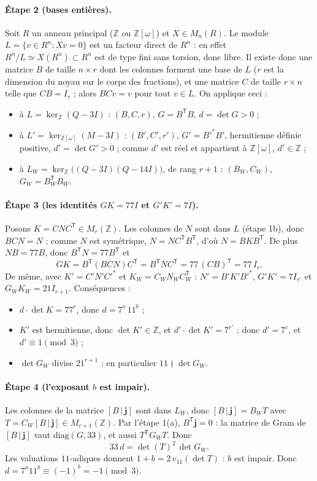 \documentclass[11pt,a4paper]{article}
\theoremstyle{remark}
\newcommand{\Z}{\mathbb{Z}}
\newcommand{\one}{\mathbf{j}}
\begin{document}
\paragraph{Étape 2 (bases entières).}
Soit $R$ un anneau principal ($\Z$ ou $\Z[\omega]$) et $X\in M_n(R)$. Le module $L=\{v\in R^n : Xv=0\}$ est un facteur direct de
$R^n$ : en effet $R^n/L\simeq X(R^n)\subset R^n$ est de type fini sans torsion, donc libre. Il existe donc une matrice $B$ de taille
$n\times r$ dont les colonnes forment une base de $L$ ($r$ est la dimension du noyau sur le corps des fractions), et une matrice
$C$ de taille $r\times n$ telle que $CB=I_r$ ; alors $BCv=v$ pour tout $v\in L$. On applique ceci :
\begin{itemize}[nosep]
\item à $L=\ker_\Z(Q-3I)$ : $(B,C,r)$, $G=B^{\mathsf T}B$, $d=\det G>0$ ;
\item à $L'=\ker_{\Z[\omega]}(M-3I)$ : $(B',C',r')$, $G'=B'^*B'$, hermitienne définie positive, $d'=\det G'>0$ ;
comme $d'$ est réel et appartient à $\Z[\omega]$, $d'\in\Z$ ;
\item à $L_W=\ker_\Z\bigl((Q-3I)(Q-14I)\bigr)$, de rang $r+1$ : $(B_W,C_W)$, $G_W=B_W^{\mathsf T}B_W$.
\end{itemize}

\paragraph{Étape 3 (les identités $GK=77I$ et $G'K'=7I$).}
Posons $K=CNC^{\mathsf T}\in M_r(\Z)$. Les colonnes de $N$ sont dans $L$ (étape 1b), donc $BCN=N$ ; comme $N$ est symétrique,
$N=NC^{\mathsf T}B^{\mathsf T}$, d'où $N=BKB^{\mathsf T}$. De plus $NB=77B$, donc $B^{\mathsf T}N=77B^{\mathsf T}$ et
\[
GK=B^{\mathsf T}(BCN)C^{\mathsf T}=B^{\mathsf T}NC^{\mathsf T}=77\,(CB)^{\mathsf T}=77\,I_r .
\]
De même, avec $K'=C'N'C'^*$ et $K_W=C_WN_WC_W^{\mathsf T}$ : $N'=B'K'B'^*$, $G'K'=7I_{r'}$ et $G_WK_W=21I_{r+1}$. Conséquences :
\begin{itemize}[nosep]
\item $d\cdot\det K=77^r$, donc $d=7^a\,11^b$ ;
\item $K'$ est hermitienne, donc $\det K'\in\Z$, et $d'\cdot\det K'=7^{r'}$ ; donc $d'=7^c$, et $d'\equiv 1\pmod 3$ ;
\item $\det G_W$ divise $21^{r+1}$ ; en particulier $11\nmid\det G_W$.
\end{itemize}

\paragraph{Étape 4 (l'exposant $b$ est impair).}
Les colonnes de la matrice $[B\,|\,\one]$ sont dans $L_W$, donc $[B\,|\,\one]=B_WT$ avec $T=C_W[B\,|\,\one]\in M_{r+1}(\Z)$.
Par l'étape 1(a), $B^{\mathsf T}\one=0$ : la matrice de Gram de $[B\,|\,\one]$ vaut $\mathrm{diag}(G,33)$, et aussi
$T^{\mathsf T}G_WT$. Donc
\[
33\,d=\det(T)^2\,\det G_W .
\]
Les valuations $11$-adiques donnent $1+b=2\,v_{11}(\det T)$ : $b$ est impair. Donc $d=7^a11^b\equiv(-1)^b=-1\pmod 3$.
\end{document}
